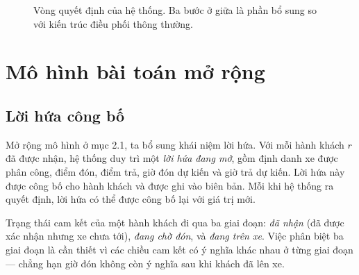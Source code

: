 \begin{figure}[htbp]
\centering
{}
\caption{Vòng quyết định của hệ thống. Ba bước ở giữa là phần bổ sung so với kiến trúc điều
phối thông thường.}
\label{hinh:vongquyetdinh}
\end{figure}

\section{Mô hình bài toán mở rộng}

\subsection{Lời hứa công bố}

Mở rộng mô hình ở mục 2.1, ta bổ sung khái niệm lời hứa. Với mỗi hành khách $r$ đã được nhận,
hệ thống duy trì một \emph{lời hứa đang mở}, gồm định danh xe được phân công, điểm đón, điểm
trả, giờ đón dự kiến và giờ trả dự kiến. Lời hứa này được công bố cho hành khách và được ghi
vào biên bản. Mỗi khi hệ thống ra quyết định, lời hứa có thể được công bố lại với giá trị mới.

Trạng thái cam kết của một hành khách đi qua ba giai đoạn: \emph{đã nhận} (đã được xác nhận
nhưng xe chưa tới), \emph{đang chờ đón}, và \emph{đang trên xe}. Việc phân biệt ba giai đoạn
là cần thiết vì các chiều cam kết có ý nghĩa khác nhau ở từng giai đoạn --- chẳng hạn giờ đón
không còn ý nghĩa sau khi khách đã lên xe.

